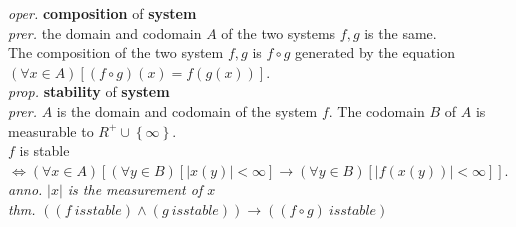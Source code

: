 \documentclass{article}
\newcommand{\sd}[1]{{\left(#1\right)}}
\newcommand{\thm}[1]{\emph{thm.} #1}
\newcommand{\anno}[1]{\emph{anno.} \emph{#1}}
\newcommand{\md}[1]{{\left[#1\right]}}
\newcommand{\ld}[1]{{\left\{#1\right\}}}
\newcommand{\prer}[1]{\emph{prer.} #1}
\newcommand{\oper}[2]{\emph{oper.} \textbf{#1} of \textbf{#2}}
\newcommand{\prop}[2]{\emph{prop.} \textbf{#1} of \textbf{#2}}
\newcommand{\abs}[1]{{\left|#1\right|}}
\begin{document}
\oper{composition}{system}\\
\prer{the domain and codomain $A$ of the two systems $f,g$ is the same.}\\
The composition of the two system $f,g$ is $f\circ g$ generated by the equation $\sd{\forall x \in A}\md{\sd{f\circ g}\sd{x} = f\sd{g\sd{x}}}$.\\
\prop{stability}{system}\\
\prer{$A$ is the domain and codomain of the system $f$. The codomain $B$ of $A$ is measurable to $R^{+}\cup\ld{\infty}$.}\\
$f$ is stable $\iff \sd{\forall x \in A}\md{\sd{\forall y \in B}\md{\abs{x\sd{y}} < \infty} \to \sd{\forall y \in B}\md{\abs{f\sd{x\sd{y}}} < \infty}}$.\\
\anno{$\abs{x}$ is the measurement of $x$}\\
\thm{$\sd{\sd{f\ is stable}\land\sd{g\ is stable}} \to \sd{\sd{f \circ g}\ is stable}$}\\
\end{document}
